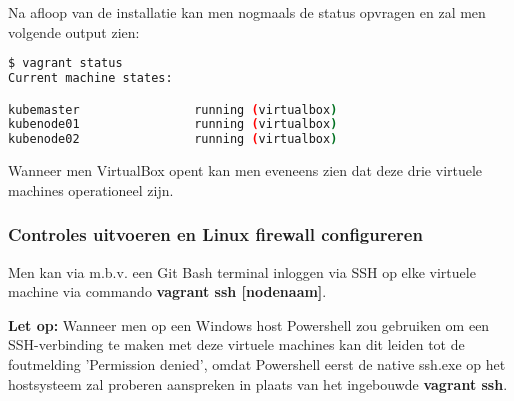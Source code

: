 Na afloop van de installatie kan men nogmaals de status opvragen en zal men volgende output zien:
\begin{lstlisting}[language=bash]
$ vagrant status
Current machine states:

kubemaster                running (virtualbox)
kubenode01                running (virtualbox)
kubenode02                running (virtualbox)
\end{lstlisting}

Wanneer men VirtualBox opent kan men eveneens zien dat deze drie virtuele machines operationeel zijn. 


\subsubsection{Controles uitvoeren en Linux firewall configureren}

Men kan via m.b.v. een Git Bash terminal inloggen via SSH op elke virtuele machine via commando {\bf vagrant ssh [nodenaam]}.

{\bf Let op:} Wanneer men op een Windows host Powershell zou gebruiken om een SSH-verbinding te maken met deze virtuele machines kan dit leiden tot de foutmelding 'Permission denied', omdat Powershell eerst de native ssh.exe op het hostsysteem zal proberen aanspreken in plaats van het ingebouwde {\bf vagrant ssh}.

